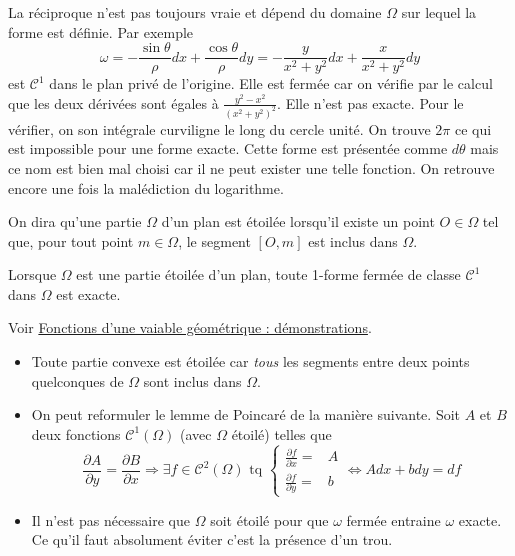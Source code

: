  La réciproque n'est pas toujours vraie et dépend du domaine $\Omega$ sur lequel la forme est définie. Par exemple 
\begin{displaymath}
 \omega = -\frac{\sin \theta}{\rho} dx +\frac{\cos \theta}{\rho}dy = -\frac{y}{x^2+y^2}dx + \frac{x}{x^2+y^2}dy
\end{displaymath}
est $\mathcal C^1$ dans le plan privé de l'origine.  Elle est fermée car on vérifie par le calcul que les deux dérivées sont égales à $\frac{y^2-x^2}{(x^2+y^2)^2}$. Elle n'est pas exacte. Pour le vérifier, on son intégrale curviligne le long du cercle unité. On trouve $2\pi$ ce qui est impossible pour une forme exacte. Cette forme est présentée comme $d\theta$ mais ce nom est bien mal choisi car il ne peut exister une telle fonction. On retrouve encore une fois la malédiction du logarithme.

\begin{defi}
 On dira qu'une partie $\Omega$ d'un plan est étoilée lorsqu'il existe un point $O\in \Omega$ tel que, pour tout point $m\in \Omega$, le segment $[O,m]$ est inclus dans $\Omega$.
\end{defi}
\begin{thm}
Lorsque $\Omega$ est une partie étoilée d'un plan, toute 1-forme fermée de classe $\mathcal C^1$ dans $\Omega$  est exacte. 
\end{thm}
\begin{demo}
 Voir \href{\baseurl C6308.pdf}{Fonctions d'une vaiable géométrique : démonstrations}.
\end{demo}

\begin{rems}
\begin{itemize}
 \item Toute partie convexe est étoilée car \emph{tous} les segments entre deux points quelconques de $\Omega$ sont inclus dans $\Omega$.
\item On peut reformuler le lemme de Poincaré de la manière suivante. Soit $A$ et $B$ deux fonctions $\mathcal C^1(\Omega)$ (avec $\Omega$ étoilé) telles que 
\begin{displaymath}
 \frac{\partial A}{\partial y} = \frac{\partial B}{\partial x} 
\Rightarrow \exists f\in \mathcal C^2(\Omega) \text{ tq }
 \left\lbrace
\begin{aligned}
 \frac{\partial f}{\partial x}=& A \\
 \frac{\partial f}{\partial y}=& b 
\end{aligned}
 \right. 
\Leftrightarrow Adx+bdy = df
\end{displaymath}
\item Il n'est pas nécessaire que $\Omega$ soit étoilé pour que $\omega$ fermée entraine $\omega$ exacte. Ce qu'il faut absolument éviter c'est la présence d'un \og trou\fg.
\end{itemize}
\end{rems}



